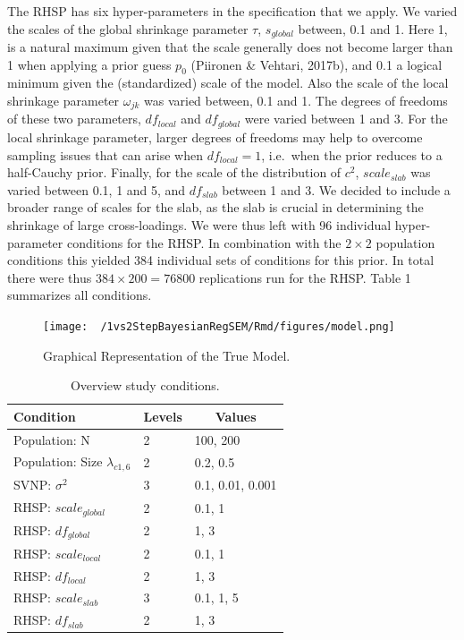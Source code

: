 \documentclass[
  man, donotrepeattitle,floatsintext]{apa6}
\begin{document}
The RHSP has six hyper-parameters in the specification that we apply. We varied the scales of the global shrinkage parameter \(\tau\), \(s_{global}\) between, 0.1 and 1. Here 1, is a natural maximum given that the scale generally does not become larger than 1 when applying a prior guess \(p_0\) (Piironen \& Vehtari, 2017b), and 0.1 a logical minimum given the (standardized) scale of the model. Also the scale of the local shrinkage parameter \(\omega_{jk}\) was varied between, 0.1 and 1. The degrees of freedoms of these two parameters, \(df_{local}\) and \(df_{global}\) were varied between 1 and 3. For the local shrinkage parameter, larger degrees of freedoms may help to overcome sampling issues that can arise when \(df_{local} = 1\), i.e.~when the prior reduces to a half-Cauchy prior. Finally, for the scale of the distribution of \(c^2\), \(scale_{slab}\) was varied between 0.1, 1 and 5, and \(df_{slab}\) between 1 and 3. We decided to include a broader range of scales for the slab, as the slab is crucial in determining the shrinkage of large cross-loadings. We were thus left with 96 individual hyper-parameter conditions for the RHSP. In combination with the \(2 \times 2\) population conditions this yielded 384 individual sets of conditions for this prior. In total there were thus \(384 \times 200 = 76800\) replications run for the RHSP. Table 1 summarizes all conditions.

\begin{figure}
\centering
\texttt{[image: ~/1vs2StepBayesianRegSEM/Rmd/figures/model.png]}
\caption{Graphical Representation of the True Model.}
\end{figure}

\begin{table}[tbp]

\begin{center}
\begin{threeparttable}

\caption{\label{tab:unnamed-chunk-2}Overview study conditions.}

\begin{tabular}{lll}
\toprule
Condition & \multicolumn{1}{c}{Levels} & \multicolumn{1}{c}{Values}\\
\midrule
Population: N & 2 & 100, 200\\
Population: Size $\lambda_{c1 , 6}$ & 2 & 0.2, 0.5\\
SVNP: $\sigma^2$ & 3 & 0.1, 0.01, 0.001\\
RHSP: $scale_{global}$ & 2 & 0.1, 1\\
RHSP: $df_{global}$ & 2 & 1, 3\\
RHSP: $scale_{local}$ & 2 & 0.1, 1\\
RHSP: $df_{local}$ & 2 & 1, 3\\
RHSP: $scale_{slab}$ & 3 & 0.1, 1, 5\\
RHSP: $df_{slab}$ & 2 & 1, 3\\
\bottomrule
\end{tabular}

\end{threeparttable}
\end{center}

\end{table}
\end{document}

